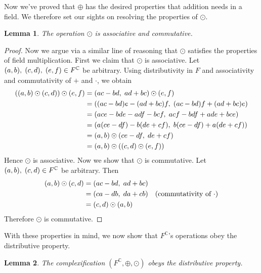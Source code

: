 \documentclass[12pt]{article}
\newcommand{\C}{\mathbb{C}}
\newcommand{\ttc}{, \hspace{1mm}}
\theoremstyle{plain}
\newtheorem{lemma}{Lemma}[section]
\theoremstyle{definition}
\begin{document}
\begin{appendices}
Now we've proved that $\oplus$ has the desired properties that addition needs in a field. We therefore set our sights on resolving the properties of $\odot$.\\

\begin{lemma}
	The operation $\odot$ is associative and commutative.
\end{lemma}

\begin{proof}
	Now we argue via a similar line of reasoning that $\odot$ satisfies the properties of field multiplication. First we claim that $\odot$ is associative. Let $(a,b)\ttc(c,d)\ttc(e,f)\in F^\C$ be arbitrary. Using distributivity in $F$ and associativity and commutativity of $+$ and $\cdot$, we obtain
\begin{align*}
		((a,b)\odot(c,d))\odot(e,f) & = (ac - bd\ttc ad + bc)\odot (e,f)\\
		& = ((ac - bd)e - (ad + bc)f\ttc (ac - bd)f + (ad + bc)e)\\
		& = (ace - bde - adf - bcf\ttc acf - bdf + ade + bce)\\
		& = (a(ce - df) - b(de + cf)\ttc b(ce - df) + a(de + cf))\\
		& = (a,b)\odot (ce - df\ttc de + cf)\\
		& = (a,b)\odot ((c,d)\odot (e,f))
\end{align*}
Hence $\odot$ is associative. Now we show that $\odot$ is commutative. Let $(a,b)\ttc(c,d)\in F^\C$ be arbitrary. Then
	\begin{align*}
		(a,b)\odot (c,d) & = (ac - bd\ttc ad + bc)\\
		& = (ca - db\ttc da + cb) & \text{(commutativity of $\cdot$)}\\
		& = (c,d)\odot (a,b)
	\end{align*}
	Therefore $\odot$ is commutative.
\end{proof}

With these properties in mind, we now show that $F^\C$'s operations obey the distributive property.\\

\begin{lemma}
	The complexification $(F^\C,\oplus,\odot)$ obeys the distributive property.
\end{lemma}


\end{appendices}
\end{document}
